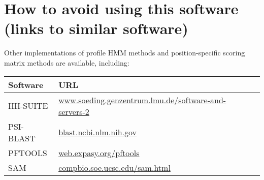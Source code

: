 \section{How to avoid using this software (links to similar software)}

Other implementations of profile HMM methods and position-specific
scoring matrix methods are available, including:

\begin{center}
\begin{tabular}{lp{5in}l}
Software  &   URL \\ \hline
HH-SUITE  & \href{http://www.soeding.genzentrum.lmu.de/software-and-servers-2/}{www.soeding.genzentrum.lmu.de/software-and-servers-2}\\
PSI-BLAST & \href{https://blast.ncbi.nlm.nih.gov/}{blast.ncbi.nlm.nih.gov}\\
PFTOOLS   & \href{http://web.expasy.org/pftools/}{web.expasy.org/pftools}\\
SAM       & \href{https://compbio.soe.ucsc.edu/sam.html}{compbio.soe.ucsc.edu/sam.html}\\
\end{tabular}
\end{center}














  









